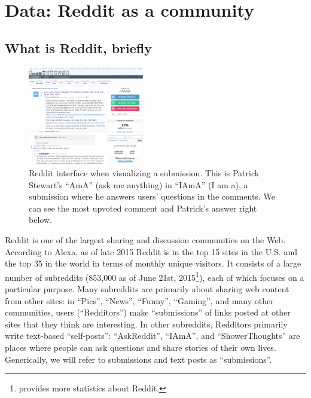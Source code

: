 \section{Data: Reddit as a community}


\subsection{What is Reddit, briefly}

\begin{figure}[!tb]
\centering
\includegraphics[width=0.45\textwidth,natwidth=964,natheight=823]{./images/reddit.png}
\caption{Reddit interface when visualizing a submission. This is Patrick Stewart's ``AmA'' (ask me anything) in ``IAmA'' (I am a), a submission where he answers users' questions in the comments. We can see the most upvoted comment and Patrick's answer right below.}
\label{fig:reddit}
\end{figure}

Reddit is one of the largest sharing and discussion communities on the Web.  According to Alexa, as of late 2015 Reddit is in the top 15 sites in the U.S. and the top 35 in the world in terms of monthly unique visitors.  It consists of a large number of subreddits (853,000 as of June 21st, 2015\footnote{\cite{RedditStatistics} provides more statistics about Reddit.}), each of which focuses on a particular purpose.  Many subreddits are primarily about sharing web content from other sites: in ``Pics'', ``News'', ``Funny'', ``Gaming'', and many other communities, users (``Redditors'') make ``submissions'' of links posted at other sites that they think are interesting.  In other subreddits, Redditors primarily write text-based ``self-posts'': ``AskReddit'', ``IAmA'', and ``ShowerThoughts'' are places where people can ask questions and share stories of their own lives.  Generically, we will refer to submissions and text posts as ``submissions''.  

